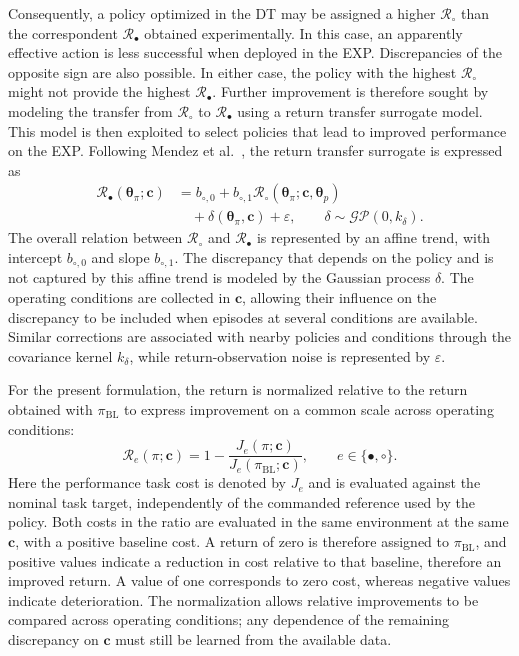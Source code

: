 \documentclass[journal]{IEEEtran}
\begin{document}
Consequently, a policy optimized in the DT may be assigned a higher $\mathcal R_\circ$ than the correspondent $\mathcal R_\bullet$ obtained experimentally. In this case, an apparently effective action is less successful when deployed in the EXP. Discrepancies of the opposite sign are also possible. In either case, the policy with the highest $\mathcal R_\circ$ might not provide the highest $\mathcal R_\bullet$. Further improvement is therefore sought by modeling the transfer from $\mathcal R_\circ$ to $\mathcal R_\bullet$ using a return transfer surrogate model. This model is then exploited to select policies that lead to improved performance on the EXP. 
Following Mendez et al.~\cite{Mendez2026}, the return transfer surrogate is expressed as
\begin{equation}
 \begin{aligned}
 \mathcal R_\bullet(\boldsymbol{\theta}_\pi;\mathbf c)
 &=b_{\circ,0}
  +b_{\circ,1}\mathcal R_\circ
    (\boldsymbol{\theta}_\pi;\mathbf c,\boldsymbol{\theta}_p)\\
 &\quad+\delta(\boldsymbol{\theta}_\pi,\mathbf c)+\varepsilon,
 \qquad \delta\sim\mathcal{GP}(0,k_\delta).
 \end{aligned}
 \label{eq:rt-surrogate}
\end{equation}
The overall relation between $\mathcal R_\circ$ and $\mathcal R_\bullet$ is represented by an affine trend, with intercept $b_{\circ,0}$ and slope $b_{\circ,1}$. The discrepancy that depends on the policy and is not captured by this affine trend is modeled by the Gaussian process $\delta$. The operating conditions are collected in $\mathbf c$, allowing their influence on the discrepancy to be included when episodes at several conditions are available. Similar corrections are associated with nearby policies and conditions through the covariance kernel $k_\delta$, while return-observation noise is represented by $\varepsilon$.

For the present formulation, the return is normalized relative to the return obtained with $\pi_{\mathrm{BL}}$ to express improvement on a common scale across operating conditions:
\begin{equation}
 \mathcal R_e(\pi;\mathbf c)
 =1-\frac{J_e(\pi;\mathbf c)}
          {J_e(\pi_{\mathrm{BL}};\mathbf c)},
 \qquad e\in\{\bullet,\circ\}.
 \label{eq:rt-normalized-reward}
\end{equation}
Here the performance task cost is denoted by $J_e$ and is evaluated against the nominal task target, independently of the commanded reference used by the policy. Both costs in the ratio are evaluated in the same environment at the same $\mathbf c$, with a positive baseline cost. A return of zero is therefore assigned to $\pi_{\mathrm{BL}}$, and positive values indicate a reduction in cost relative to that baseline, therefore an improved return. A value of one corresponds to zero cost, whereas negative values indicate deterioration. The normalization allows relative improvements to be compared across operating conditions; any dependence of the remaining discrepancy on $\mathbf c$ must still be learned from the available data.
\end{document}
